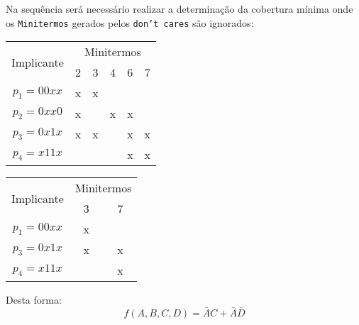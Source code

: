 \documentclass{article}
\begin{document}
\begin{resolution}
\begin{table}[H]
                \end{table}\noindent
                Na sequência será necessário realizar a determinação da cobertura mínima onde os \texttt{Minitermos} gerados pelos \texttt{don't cares} são ignorados:
                    \begin{table}[H]
                        \centering\begin{tabular}{c|ccccc}
                            \multirow{2}{*}{Implicante} & \multicolumn{5}{c}{Minitermos}\\
                                                        &2&3&4&6&7\\\hline
                            $p_1 = 00xx$                &x&x& & & \\
                            \textcolor{blue!75}{$p_2=0xx0$} &x& &x&x& \\
                            $p_3 = 0x1x$                &x&x& &x&x\\
                            $p_4 = x11x$                & & & &x&x\\\hline
                        \end{tabular}
                        \qquad
                        \centering\begin{tabular}{c|cc}
                            \multirow{2}{*}{Implicante} & \multicolumn{2}{c}{Minitermos}\\
                                                        &3&7\\\hline
                            $p_1 = 00xx$                &x& \\
                            \textcolor{blue!75}{$p_3=0x1x$} &x&x\\
                            $p_4 = x11x$                & &x\\\hline
                        \end{tabular}
                    \end{table}
                Desta forma:
                    \begin{equation}
                        \boxed{f(A,B,C,D) = \bar{A}C + \bar{A}\bar{D}}
                    \end{equation}
            \end{resolution}
\end{document}
